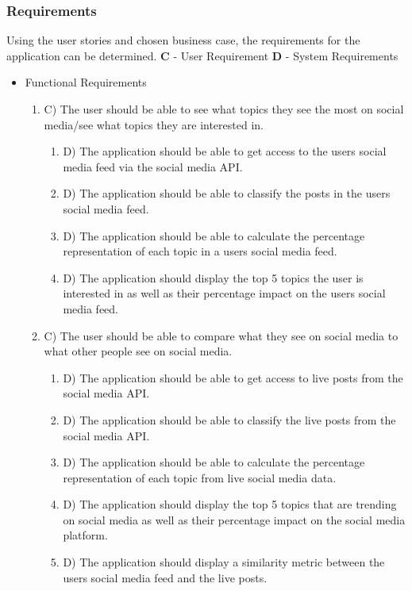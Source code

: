 \subsubsection{Requirements}
Using the user stories and chosen business case, the requirements for the application can be determined. \textbf{C} - User Requirement
\textbf{D} - System Requirements
\begin{itemize}
    \item Functional Requirements
    \begin{enumerate}
        \item C) The user should be able to see what topics they see the most on social media/see what topics they are interested in.
        \begin{enumerate}
            \item D) The application should be able to get access to the users social media feed via the social media API.
            \item D) The application should be able to classify the posts in the users social media feed.
            \item D) The application should be able to calculate the percentage representation of each topic in a users social media feed.
            \item D) The application should display the top 5 topics the user is interested in as well as their percentage impact on the users social media feed.
        \end{enumerate}
        \item C) The user should be able to compare what they see on social media to what other people see on social media.
        \begin{enumerate}
            \item D) The application should be able to get access to live posts from the social media API.
            \item D) The application should be able to classify the live posts from the social media API.
            \item D) The application should be able to calculate the percentage representation of each topic from live social media data.
            \item D) The application should display the top 5 topics that are trending on social media as well as their percentage impact on the social media platform.
            \item D) The application should display a similarity metric between the users social media feed and the live posts.

\end{enumerate}
\end{enumerate}
\end{itemize}
